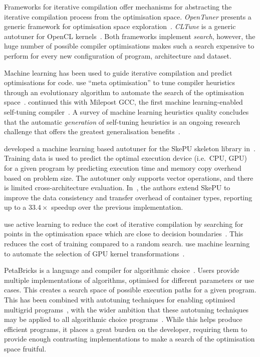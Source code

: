 Frameworks for iterative compilation offer mechanisms for abstracting the iterative compilation process from the optimisation space. \emph{OpenTuner} presents a generic framework for optimisation space exploration~\cite{Ansel2013}. \emph{CLTune} is a generic autotuner for OpenCL kernels~\cite{Nugteren2015}. Both frameworks implement \emph{search}, however, the huge number of possible compiler optimisations makes such a search expensive to perform for every new configuration of program, architecture and dataset.

Machine learning has been used to guide iterative compilation and predict optimisations for code. \citeauthor{Stephenson2003} use ``meta optimisation'' to tune compiler heuristics through an evolutionary algorithm to automate the search of the optimisation space~\cite{Stephenson2003}. \citeauthor{Fursin2011} continued this with Milepost GCC, the first machine learning-enabled self-tuning compiler~\cite{Fursin2011}. A survey of machine learning heuristics quality concludes that the automatic \emph{generation} of self-tuning heuristics is an ongoing research challenge that offers the greatest generalisation benefits~\cite{Burke2013}.

\citeauthor{Dastgeer2011} developed a machine learning based autotuner for the SkePU skeleton library in~\cite{Dastgeer2011}. Training data is used to predict the optimal execution device (i.e.\ CPU, GPU) for a given program by predicting execution time and memory copy overhead based on problem size. The autotuner only supports vector operations, and there is limited cross-architecture evaluation. In~\cite{Dastgeer2015a}, the authors extend SkePU to improve the data consistency and transfer overhead of container types, reporting up to a $33.4\times$ speedup over the previous implementation.

\citeauthor{Ogilvie2015} use active learning to reduce the cost of iterative compilation by searching for points in the optimisation space which are close to decision boundaries~\cite{Ogilvie2015}. This reduces the cost of training compared to a random search. \citeauthor{Wahib2015a} use machine learning to automate the selection of GPU kernel transformations~\cite{Wahib2015a}.

PetaBricks is a language and compiler for algorithmic choice~\cite{Ansel2009a}. Users provide multiple implementations of algorithms, optimised for different parameters or use cases. This creates a search space of possible execution paths for a given program. This has been combined with autotuning techniques for enabling optimised multigrid programs~\cite{Chan2009}, with the wider ambition that these autotuning techniques may be applied to all algorithmic choice programs~\cite{Ansel2014}. While this helps produce efficient programs, it places a great burden on the developer, requiring them to provide enough contrasting implementations to make a search of the optimisation space fruitful.

